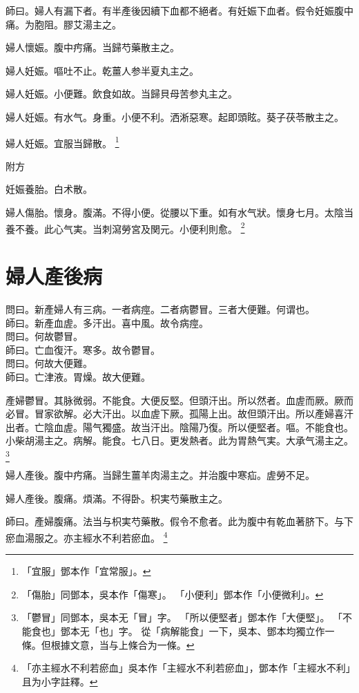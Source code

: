 師曰。婦人有漏下者。有半產後因續下血都不絕者。有妊娠下血者。假令妊娠腹中痛。为胞阻。膠艾湯主之。

婦人懷娠。腹中㽲痛。当歸芍藥散主之。

婦人妊娠。嘔吐不止。乾薑人参半夏丸主之。

婦人妊娠。小便難。飲食如故。当歸貝母苦参丸主之。

婦人妊娠。有水气。身重。小便不利。洒淅惡寒。起即頭眩。葵子茯苓散主之。

婦人妊娠。宜服当歸散。
	\footnote{
		「宜服」鄧本作「宜常服」。
	}

附方

妊娠養胎。白术散。

婦人傷胎。懷身。腹滿。不得小便。從腰以下重。如有水气狀。懷身七月。太陰当養不養。此心气実。当刺瀉勞宮及関元。小便利則愈。
	\footnote{
		「傷胎」同鄧本，吳本作「傷寒」。
		「小便利」鄧本作「小便微利」。
	}

\chapter{婦人產後病}

問曰。新產婦人有三病。一者病痙。二者病鬱冒。三者大便難。何谓也。\\
師曰。新產血虗。多汗出。喜中風。故令病痙。\\
{\khaai 問曰。}何故鬱冒。\\
{\khaai 師曰。}亡血復汗。寒多。故令鬱冒。\\
{\khaai 問曰。}何故大便難。\\
{\khaai 師曰。}亡津液。胃燥。故大便難。

產婦鬱{\khaai 冒}。其脉微弱。不能食。大便反堅。但頭汗出。所以然者。血虗而厥。厥而必冒。冒家欲解。必大汗出。以血虗下厥。孤陽上出。故但頭汗出。所以產婦喜汗出者。亡陰血虗。陽气獨盛。故当汗出。陰陽乃復。所以便堅者。嘔。不能食也。小柴胡湯主之。病解。能食。七八日。更发熱者。此为胃熱气実。大承气湯主之。
	\footnote{
		「鬱冒」同鄧本，吳本无「冒」字。
		「所以便堅者」鄧本作「大便堅」。
		「不能食也」鄧本无「也」字。
		從「病解能食」一下，吳本、鄧本均獨立作一條。但根據文意，当与上條合为一條。
	}

婦人產後。腹中㽲痛。当歸生薑羊肉湯主之。并治腹中寒疝。虗勞不足。

婦人產後。腹痛。煩滿。不得卧。枳実芍藥散主之。

師曰。產婦腹痛。法当与枳実芍藥散。假令不愈者。此为腹中有乾血著脐下。与下瘀血湯服之。{\khaai 亦}主經水不利若瘀血。
	\footnote{
		「亦主經水不利若瘀血」吳本作「主經水不利若瘀血」，鄧本作「主經水不利」且为小字註釋。
	}

